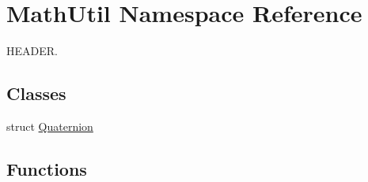 \hypertarget{namespaceMathUtil}{}\section{Math\+Util Namespace Reference}
\label{namespaceMathUtil}


H\+E\+A\+D\+ER.  


\subsection*{Classes}
\begin{DoxyCompactItemize}
\item 
struct \hyperlink{structMathUtil_1_1Quaternion}{Quaternion}
\end{DoxyCompactItemize}
\subsection*{Functions}
